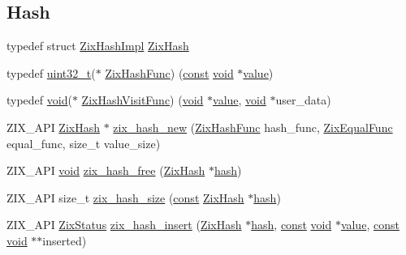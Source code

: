 \subsection*{Hash}
\begin{DoxyCompactItemize}
\item 
typedef struct \hyperlink{struct_zix_hash_impl}{Zix\+Hash\+Impl} \hyperlink{group__zix_ga7bcf5a36494242a0570b0d5c6f9e171b}{Zix\+Hash}
\item 
typedef \hyperlink{lib-src_2ffmpeg_2win32_2stdint_8h_a6eb1e68cc391dd753bc8ce896dbb8315}{uint32\+\_\+t}($\ast$ \hyperlink{group__zix_ga42772c8370d1039115cca0504a225aee}{Zix\+Hash\+Func}) (\hyperlink{getopt1_8c_a2c212835823e3c54a8ab6d95c652660e}{const} \hyperlink{sound_8c_ae35f5844602719cf66324f4de2a658b3}{void} $\ast$\hyperlink{lib_2expat_8h_a4a30a13b813682e68c5b689b45c65971}{value})
\item 
typedef \hyperlink{sound_8c_ae35f5844602719cf66324f4de2a658b3}{void}($\ast$ \hyperlink{group__zix_ga458305f092f4cce9cccf4004a0fa3d82}{Zix\+Hash\+Visit\+Func}) (\hyperlink{sound_8c_ae35f5844602719cf66324f4de2a658b3}{void} $\ast$\hyperlink{lib_2expat_8h_a4a30a13b813682e68c5b689b45c65971}{value}, \hyperlink{sound_8c_ae35f5844602719cf66324f4de2a658b3}{void} $\ast$user\+\_\+data)
\item 
Z\+I\+X\+\_\+\+A\+PI \hyperlink{group__zix_ga7bcf5a36494242a0570b0d5c6f9e171b}{Zix\+Hash} $\ast$ \hyperlink{group__zix_ga4e486764dfc217ea4792440c17052ea8}{zix\+\_\+hash\+\_\+new} (\hyperlink{group__zix_ga42772c8370d1039115cca0504a225aee}{Zix\+Hash\+Func} hash\+\_\+func, \hyperlink{group__zix_ga4cb30cbc7c5989a17b2b73ee23f63686}{Zix\+Equal\+Func} equal\+\_\+func, size\+\_\+t value\+\_\+size)
\item 
Z\+I\+X\+\_\+\+A\+PI \hyperlink{sound_8c_ae35f5844602719cf66324f4de2a658b3}{void} \hyperlink{group__zix_gaae5292c041262d550660b32710a0b3dd}{zix\+\_\+hash\+\_\+free} (\hyperlink{group__zix_ga7bcf5a36494242a0570b0d5c6f9e171b}{Zix\+Hash} $\ast$\hyperlink{xlsym_8c_ac6dd7f9597bde69a9a1a196f2f87c9be}{hash})
\item 
Z\+I\+X\+\_\+\+A\+PI size\+\_\+t \hyperlink{group__zix_gabebdf1ac7bb7001b54a03cfe3e0d6e7d}{zix\+\_\+hash\+\_\+size} (\hyperlink{getopt1_8c_a2c212835823e3c54a8ab6d95c652660e}{const} \hyperlink{group__zix_ga7bcf5a36494242a0570b0d5c6f9e171b}{Zix\+Hash} $\ast$\hyperlink{xlsym_8c_ac6dd7f9597bde69a9a1a196f2f87c9be}{hash})
\item 
Z\+I\+X\+\_\+\+A\+PI \hyperlink{group__zix_ga8ff29bfb81c64f449534790cac128b19}{Zix\+Status} \hyperlink{group__zix_ga23645626d84de15ad64d383f8c87cee7}{zix\+\_\+hash\+\_\+insert} (\hyperlink{group__zix_ga7bcf5a36494242a0570b0d5c6f9e171b}{Zix\+Hash} $\ast$\hyperlink{xlsym_8c_ac6dd7f9597bde69a9a1a196f2f87c9be}{hash}, \hyperlink{getopt1_8c_a2c212835823e3c54a8ab6d95c652660e}{const} \hyperlink{sound_8c_ae35f5844602719cf66324f4de2a658b3}{void} $\ast$\hyperlink{lib_2expat_8h_a4a30a13b813682e68c5b689b45c65971}{value}, \hyperlink{getopt1_8c_a2c212835823e3c54a8ab6d95c652660e}{const} \hyperlink{sound_8c_ae35f5844602719cf66324f4de2a658b3}{void} $\ast$$\ast$inserted)
$$
\end{DoxyCompactItemize}
